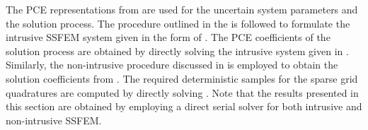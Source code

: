 \documentclass[letter,1p,11pt,oneside,onecolumn,sort&compress]{elsarticle}
\begin{document}
The PCE representations from  are used for the uncertain system parameters and the solution process. The procedure outlined in the  is followed to formulate the intrusive SSFEM system given in the form of . The PCE coefficients of the solution process are obtained by directly solving the intrusive system given in . Similarly, the non-intrusive procedure discussed in  is employed to obtain the solution coefficients from . The required deterministic samples for the sparse grid quadratures are computed by directly solving . Note that the results presented in this section are obtained by employing a direct serial solver for both intrusive and non-intrusive SSFEM.
\end{document}
